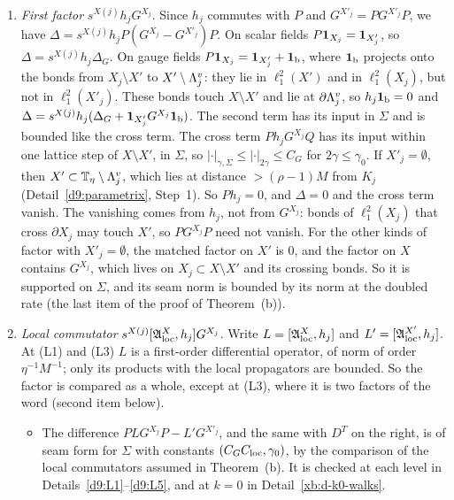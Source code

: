 \begin{detail}
\begin{step}
\begin{enumerate}[label=(\alph*)]
\item \emph{First factor} $s^{X(j)}h_jG^{X_j}$. Since $h_j$ commutes with $P$ and $G^{X'_j}=PG^{X'_j}P$, we have $\Delta=s^{X(j)}h_jP(G^{X_j}-G^{X'_j})P$. On scalar fields $P\mathbf 1_{X_j}=\mathbf 1_{X'_j}$, so $\Delta=s^{X(j)}h_j\Delta_G$. On gauge fields $P\mathbf 1_{X_j}=\mathbf 1_{X'_j}+\mathbf 1_{\rm b}$, where $\mathbf 1_{\rm b}$ projects onto the bonds from $X_j\setminus X'$ to $X'\setminus\Lambda^v_j$: they lie in $\ell^2_1(X')$ and in $\ell^2_1(X_j)$, but not in $\ell^2_1(X'_j)$. These bonds touch $X\setminus X'$ and lie at $\partial\Lambda^v_j$, so $h_j\mathbf 1_{\rm b}=0$ and $\Delta=s^{X(j)}h_j(\Delta_G+\mathbf 1_{X'_j}G^{X_j}\mathbf 1_{\rm b})$. The second term has its input in $\Sigma$ and is bounded like the cross term. The cross term $Ph_jG^{X_j}Q$ has its input within one lattice step of $X\setminus X'$, in $\Sigma$, so $|\cdot|_{\gamma,\Sigma}\le|\cdot|_{2\gamma}\le C_G$ for $2\gamma\le\gamma_0$. If $X'_j=\emptyset$, then $X'\subset\mathbb T_\eta\setminus\Lambda^v_j$, which lies at distance $>(\rho-1)M$ from $K_j$ (Detail~\ref{d9:parametrix}, Step~1). So $Ph_j=0$, and $\Delta=0$ and the cross term vanish. The vanishing comes from $h_j$, not from $G^{X_j}$: bonds of $\ell^2_1(X_j)$ that cross $\partial X_j$ may touch $X'$, so $PG^{X_j}P$ need not vanish. For the other kinds of factor with $X'_j=\emptyset$, the matched factor on $X'$ is $0$, and the factor on $X$ contains $G^{X_j}$, which lives on $X_j\subset X\setminus X'$ and its crossing bonds. So it is supported on $\Sigma$, and its seam norm is bounded by its norm at the doubled rate (the last item of the proof of Theorem~(b)).
\item \emph{Local commutator} $s^{X(j)}[\mathfrak A^X_{\rm loc},h_j]G^{X_j}$. Write $L=[\mathfrak A^X_{\rm loc},h_j]$ and $L'=[\mathfrak A^{X'}_{\rm loc},h_j]$. At (L1) and (L3) $L$ is a first-order differential operator, of norm of order $\eta^{-1}M^{-1}$; only its products with the local propagators are bounded. So the factor is compared as a whole, except at (L3), where it is two factors of the word (second item below).
\begin{itemize}
\item The difference $PLG^{X_j}P-L'G^{X'_j}$, and the same with $D^T$ on the right, is of seam form for $\Sigma$ with constants $(C_GC_{\rm loc},\gamma_0)$, by the comparison of the local commutators assumed in Theorem~(b). It is checked at each level in Details~\ref{d9:L1}--\ref{d9:L5}, and at $k=0$ in Detail~\ref{xb:d-k0-walks}.

\end{itemize}
\end{enumerate}
\end{step}
\end{detail}
